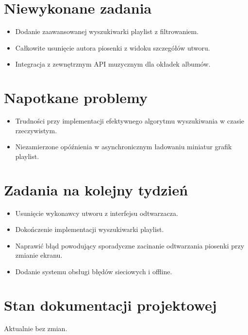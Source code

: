 \documentclass[12pt,a4paper]{article}
\begin{document}
\section{Niewykonane zadania}
\begin{itemize}
    \item Dodanie zaawansowanej wyszukiwarki playlist z filtrowaniem.
    \item Całkowite usunięcie autora piosenki z widoku szczegółów utworu.
    \item Integracja z zewnętrznym API muzycznym dla okładek albumów.
\end{itemize}

\section{Napotkane problemy}
\begin{itemize}
    \item Trudności przy implementacji efektywnego algorytmu wyszukiwania w czasie rzeczywistym.
    \item Niezamierzone opóźnienia w asynchronicznym ładowaniu miniatur grafik playlist.
\end{itemize}

\section{Zadania na kolejny tydzień}
\begin{itemize}
    \item Usunięcie wykonawcy utworu z interfejsu odtwarzacza.
    \item Dokończenie implementacji wyszukiwarki playlist.
    \item Naprawić błąd powodujący sporadyczne zacinanie odtwarzania piosenki przy zmianie ekranu.
    \item Dodanie systemu obsługi błędów sieciowych i offline.
\end{itemize}

\section{Stan dokumentacji projektowej}
Aktualnie bez zmian.
\end{document}
